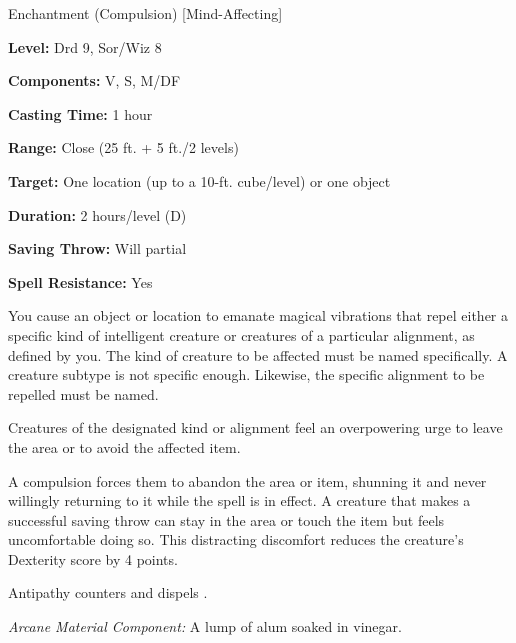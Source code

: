 
Enchantment (Compulsion) [Mind-Affecting]

\textbf{Level:} Drd 9, Sor/Wiz 8

\textbf{Components:} V, S, M/DF

\textbf{Casting Time:} 1 hour

\textbf{Range:} Close (25 ft. + 5 ft./2 levels)

\textbf{Target:} One location (up to a 10-ft. cube/level) or one object

\textbf{Duration:} 2 hours/level (D)

\textbf{Saving Throw:} Will partial

\textbf{Spell Resistance:} Yes

You cause an object or location to emanate magical vibrations that repel either 
a specific kind of intelligent creature or creatures of a particular alignment, 
as defined by you. The kind of creature to be affected must be named specifically. 
A creature subtype is not specific enough. Likewise, the specific alignment to 
be repelled must be named.

Creatures of the designated kind or alignment feel an overpowering urge to leave 
the area or to avoid the affected item.

A compulsion forces them to abandon the area or item, shunning it and never willingly 
returning to it while the spell is in effect. A creature that makes a successful 
saving throw can stay in the area or touch the item but feels uncomfortable doing 
so. This distracting discomfort reduces the creature's Dexterity score by 4 points.

Antipathy counters and dispels .

\textit{Arcane Material Component:} A lump of alum soaked in vinegar.

